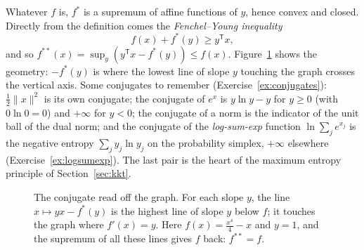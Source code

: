 Whatever $f$ is, $f^*$ is a supremum of affine functions of $y$, hence convex and closed. Directly from the definition comes the \emph{Fenchel--Young inequality}
\[
f(x)+f^*(y)\ge y^{\mathsf T}x,
\]
and so $f^{**}(x)=\sup_y(y^{\mathsf T}x-f^*(y))\le f(x)$. Figure~\ref{fig:conjugate} shows the geometry: $-f^*(y)$ is where the lowest line of slope $y$ touching the graph
crosses the vertical axis. Some conjugates to remember (Exercise~\ref{ex:conjugates}): $\frac12\|x\|^2$ is its own conjugate; the conjugate of $e^x$ is $y\ln y-y$ for $y\ge0$
(with $0\ln0=0$) and $+\infty$ for $y<0$; the conjugate of a norm is the indicator of the unit ball of the dual norm; and the conjugate of the \emph{log-sum-exp} function
$\ln\sum_je^{x_j}$ is the negative entropy $\sum_jy_j\ln y_j$ on the probability simplex, $+\infty$ elsewhere (Exercise~\ref{ex:logsumexp}). The last pair is the heart of the maximum
entropy principle of Section~\ref{sec:kkt}.

\begin{figure}[ht]
\centering
{}
\caption{The conjugate read off the graph. For each slope $y$, the line $x\mapsto yx-f^*(y)$ is the highest line of slope $y$ below $f$; it touches the graph where $f'(x)=y$.
Here $f(x)=\frac{x^4}4-x$ and $y=1$, and the supremum of all these lines gives $f$ back: $f^{**}=f$.}
\label{fig:conjugate}
\end{figure}

